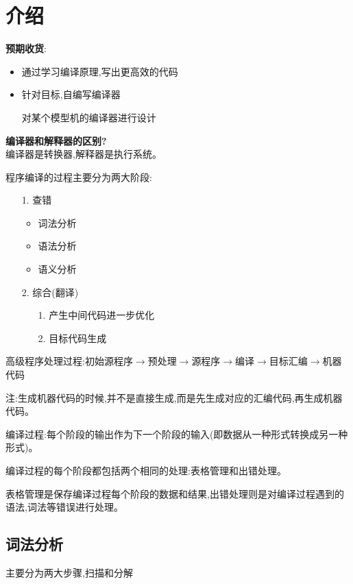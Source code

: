   \section{介绍}

  \textbf{预期收货}:
  \begin{itemize}
    \item 通过学习编译原理,写出更高效的代码
    \item 针对目标,自编写编译器

    对某个模型机的编译器进行设计
  \end{itemize}

  \textbf{编译器和解释器的区别?}\\
  编译器是转换器,解释器是执行系统。

  \spaceline

  程序编译的过程主要分为两大阶段:
  \begin{itemize}
    \item [1.] 查错
    \begin{itemize}
      \item 词法分析
      \item 语法分析
      \item 语义分析
    \end{itemize}

    \item [2.] 综合(翻译)
    \begin{itemize}
      \item [1.] 产生中间代码进一步优化
      \item [2.] 目标代码生成
    \end{itemize}
  \end{itemize}

  高级程序处理过程:初始源程序$\to$预处理$\to$源程序$\to$编译$\to$目标汇编$\to$机器代码

  注:生成机器代码的时候,并不是直接生成,而是先生成对应的汇编代码,再生成机器代码。

  编译过程:每个阶段的输出作为下一个阶段的输入(即数据从一种形式转换成另一种形式)。

  编译过程的每个阶段都包括两个相同的处理:表格管理和出错处理。

  表格管理是保存编译过程每个阶段的数据和结果,出错处理则是对编译过程遇到的语法,词法等错误进行处理。

    \subsection{词法分析}
    主要分为两大步骤,扫描和分解

